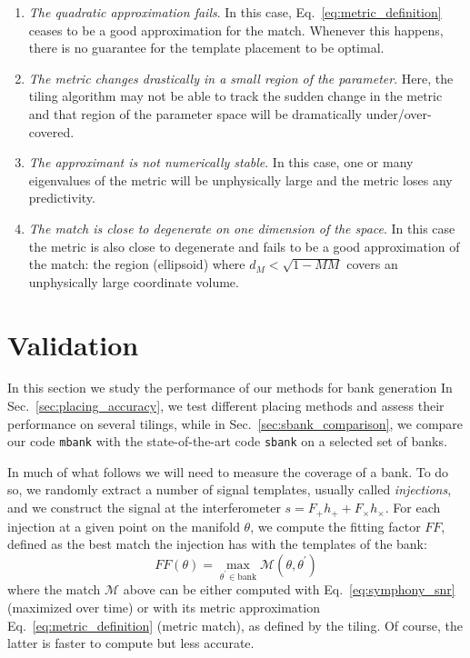 \documentclass[twocolumn,showpacs,preprintnumbers,nofootinbib,prd,
superscriptaddress,10pt]{revtex4-2}
\begin{document}
\begin{enumerate}
	\item {\it The quadratic approximation fails}. In this case, Eq.~\eqref{eq:metric_definition} ceases to be a good approximation for the match. Whenever this happens, there is no guarantee for the template placement to be optimal.
	\item {\it The metric changes drastically in a small region of the parameter}. Here, the tiling algorithm may not be able to track the sudden change in the metric and that region of the parameter space will be dramatically under/over-covered.
	\item {\it The approximant is not numerically stable}. In this case, one or many eigenvalues of the metric will be unphysically large and the metric loses any predictivity.
	\item {\it The match is close to degenerate on one dimension of the space}. In this case the metric is also close to degenerate and fails to be a good approximation of the match: the region (ellipsoid) where $d_M<\sqrt{1-MM}$ covers an unphysically large coordinate volume.
\end{enumerate}

\section{Validation} \label{sec:validation}

In this section we study the performance of our methods for bank generation
In Sec.~\ref{sec:placing_accuracy}, we test different placing methods and assess their performance on several tilings, while in Sec.~\ref{sec:sbank_comparison}, we compare our code \texttt{mbank} with the state-of-the-art code \texttt{sbank} \cite{Ajith:2012mn} on a selected set of banks.

In much of what follows we will need to measure the coverage of a bank. To do so, we randomly extract a number of signal templates, usually called {\it injections}, and we construct the signal at the interferometer ${s = F_+h_+ + F_\times h_\times}$.
For each injection at a given point on the manifold $\theta$, we compute the fitting factor $FF$, defined as the best match the injection has with the templates of the bank:
\begin{equation}\label{eq:FF}
	FF(\theta) = \max_{\theta^\prime \in \text{bank}} \mathcal{M}(\theta, \theta^\prime)
\end{equation}
where the match $\mathcal{M}$ above can be either computed with Eq.~\eqref{eq:symphony_snr} (maximized over time) or with its metric approximation Eq.~\eqref{eq:metric_definition} (metric match), as defined by the tiling.
Of course, the latter is faster to compute but less accurate.
\end{document}
